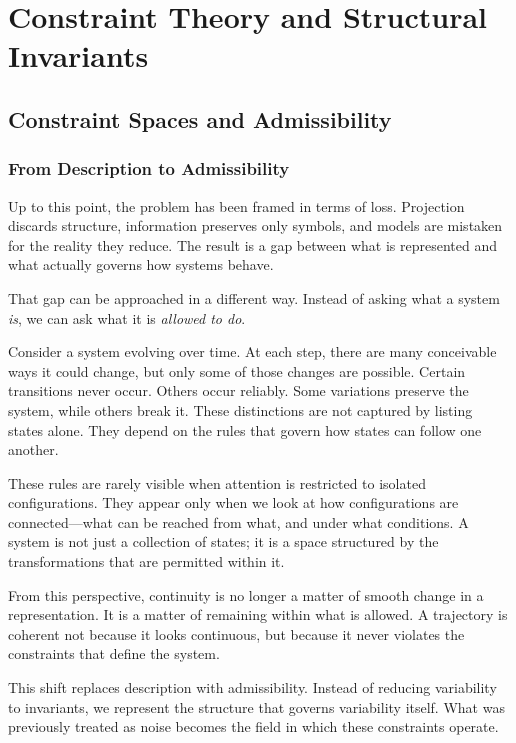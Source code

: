 \documentclass[11pt,openany]{book}
\begin{document}
\part{Constraint Theory and Structural Invariants}

\chapter{Constraint Spaces and Admissibility}
\label{ch:constraint-spaces}

\section*{ From Description to Admissibility}

Up to this point, the problem has been framed in terms of loss. Projection discards structure, information preserves only symbols, and models are mistaken for the reality they reduce. The result is a gap between what is represented and what actually governs how systems behave.

That gap can be approached in a different way. Instead of asking what a system \emph{is}, we can ask what it is \emph{allowed to do}.

Consider a system evolving over time. At each step, there are many conceivable ways it could change, but only some of those changes are possible. Certain transitions never occur. Others occur reliably. Some variations preserve the system, while others break it. These distinctions are not captured by listing states alone. They depend on the rules that govern how states can follow one another.

These rules are rarely visible when attention is restricted to isolated configurations. They appear only when we look at how configurations are connected—what can be reached from what, and under what conditions. A system is not just a collection of states; it is a space structured by the transformations that are permitted within it.

From this perspective, continuity is no longer a matter of smooth change in a representation. It is a matter of remaining within what is allowed. A trajectory is coherent not because it looks continuous, but because it never violates the constraints that define the system.

This shift replaces description with admissibility. Instead of reducing variability to invariants, we represent the structure that governs variability itself. What was previously treated as noise becomes the field in which these constraints operate.
\end{document}

